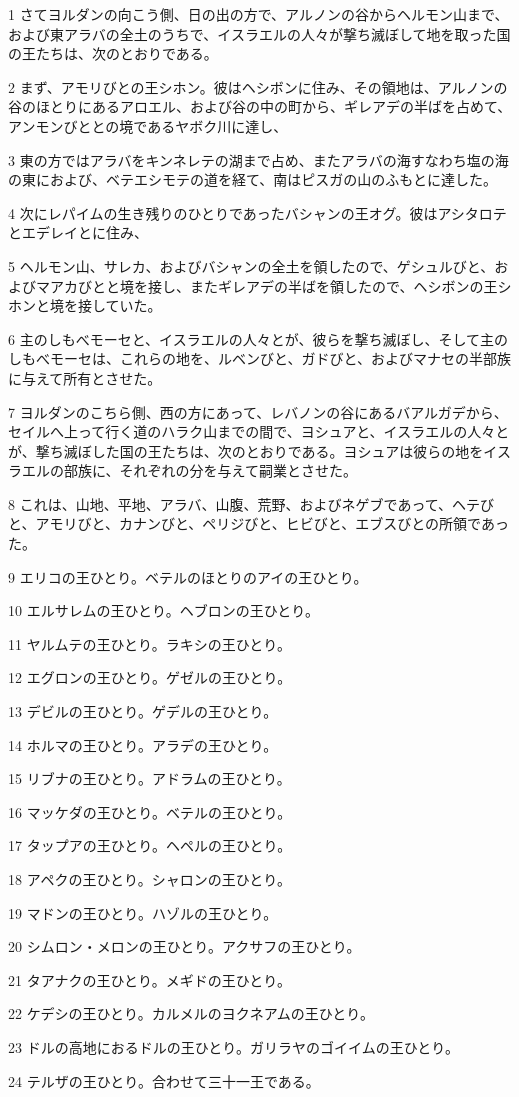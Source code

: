 \par 1 さてヨルダンの向こう側、日の出の方で、アルノンの谷からヘルモン山まで、および東アラバの全土のうちで、イスラエルの人々が撃ち滅ぼして地を取った国の王たちは、次のとおりである。
\par 2 まず、アモリびとの王シホン。彼はヘシボンに住み、その領地は、アルノンの谷のほとりにあるアロエル、および谷の中の町から、ギレアデの半ばを占めて、アンモンびととの境であるヤボク川に達し、
\par 3 東の方ではアラバをキンネレテの湖まで占め、またアラバの海すなわち塩の海の東におよび、ベテエシモテの道を経て、南はピスガの山のふもとに達した。
\par 4 次にレパイムの生き残りのひとりであったバシャンの王オグ。彼はアシタロテとエデレイとに住み、
\par 5 ヘルモン山、サレカ、およびバシャンの全土を領したので、ゲシュルびと、およびマアカびとと境を接し、またギレアデの半ばを領したので、ヘシボンの王シホンと境を接していた。
\par 6 主のしもべモーセと、イスラエルの人々とが、彼らを撃ち滅ぼし、そして主のしもべモーセは、これらの地を、ルベンびと、ガドびと、およびマナセの半部族に与えて所有とさせた。
\par 7 ヨルダンのこちら側、西の方にあって、レバノンの谷にあるバアルガデから、セイルへ上って行く道のハラク山までの間で、ヨシュアと、イスラエルの人々とが、撃ち滅ぼした国の王たちは、次のとおりである。ヨシュアは彼らの地をイスラエルの部族に、それぞれの分を与えて嗣業とさせた。
\par 8 これは、山地、平地、アラバ、山腹、荒野、およびネゲブであって、ヘテびと、アモリびと、カナンびと、ペリジびと、ヒビびと、エブスびとの所領であった。
\par 9 エリコの王ひとり。ベテルのほとりのアイの王ひとり。
\par 10 エルサレムの王ひとり。ヘブロンの王ひとり。
\par 11 ヤルムテの王ひとり。ラキシの王ひとり。
\par 12 エグロンの王ひとり。ゲゼルの王ひとり。
\par 13 デビルの王ひとり。ゲデルの王ひとり。
\par 14 ホルマの王ひとり。アラデの王ひとり。
\par 15 リブナの王ひとり。アドラムの王ひとり。
\par 16 マッケダの王ひとり。ベテルの王ひとり。
\par 17 タップアの王ひとり。ヘペルの王ひとり。
\par 18 アペクの王ひとり。シャロンの王ひとり。
\par 19 マドンの王ひとり。ハゾルの王ひとり。
\par 20 シムロン・メロンの王ひとり。アクサフの王ひとり。
\par 21 タアナクの王ひとり。メギドの王ひとり。
\par 22 ケデシの王ひとり。カルメルのヨクネアムの王ひとり。
\par 23 ドルの高地におるドルの王ひとり。ガリラヤのゴイイムの王ひとり。
\par 24 テルザの王ひとり。合わせて三十一王である。


